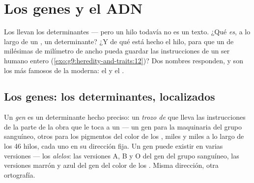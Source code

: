 \chapter{Los genes y el ADN}\label{ch:g9:genes-and-dna}

Los  llevan los determinantes --- pero un hilo todavía no es
un texto. ¿Qué \emph{es}, a lo largo de un , un determinante?
¿Y de qué está hecho el hilo, para que un  de milésimas de
milímetro de ancho pueda guardar las instrucciones de un ser humano
entero (\cref{exo:g9:heredity-and-traits:12})? Dos nombres responden, y
son los más famosos de la  moderna: el  y el .

\section{Los genes: los determinantes, localizados}

\begin{definition}\label{def:g9:genes-and-dna:gene}
Un \emph{gen} es un determinante hecho preciso: un
\emph{trozo de } que lleva las instrucciones de la parte de la
obra que le toca a un  --- un gen para la maquinaria del grupo
sanguíneo, otros para los pigmentos del color de los , miles y
miles a lo largo de los 46 hilos, cada uno en su dirección fija. Un gen
puede existir en varias versiones --- los \emph{alelos}:
las versiones A, B y O del gen del grupo sanguíneo, las versiones
marrón y azul del gen del color de los . Misma dirección, otra
ortografía.
\end{definition}

